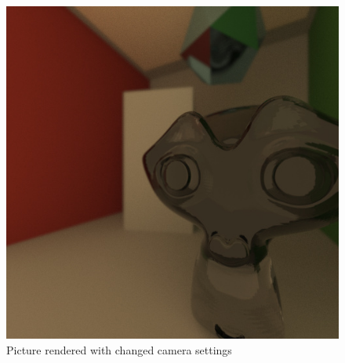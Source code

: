 \documentclass[11pt,a4paper]{article}
\begin{document}
\begin{itemize}
\begin{figure}[h]
\begin{center}
\includegraphics[scale=1.0]{images/changedCameraPosition1000spp}
\caption[Picture showing changed camera settings]{Picture rendered with changed camera settings}
\label{fig:4}
\end{center}
\end{figure}


\end{itemize}
\end{document}
